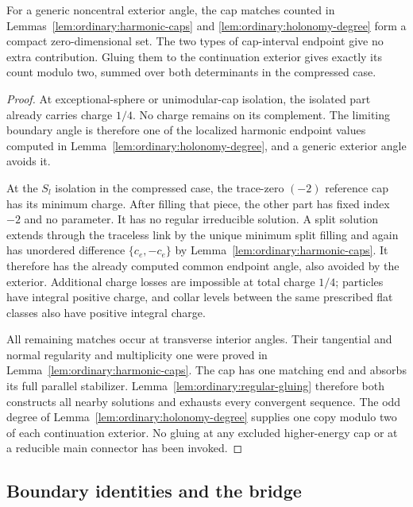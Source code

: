 \begin{lemma}
\label{lem:ordinary:cap-end-compactness}
For a generic noncentral exterior angle, the cap matches counted
in Lemmas~\ref{lem:ordinary:harmonic-caps} and
\ref{lem:ordinary:holonomy-degree} form a compact zero-dimensional
set.  The two types of cap-interval endpoint give no extra
contribution.  Gluing them to the continuation exterior gives
exactly its count modulo two, summed over both determinants
in the compressed case.
\end{lemma}
\begin{proof}
At exceptional-sphere or unimodular-cap isolation, the isolated
part already carries charge $1/4$.  No charge remains on
its complement.  The limiting boundary angle is therefore
one of the localized harmonic endpoint values computed in
Lemma~\ref{lem:ordinary:holonomy-degree}, and a generic
exterior angle avoids it.

At the $S_l$ isolation in the compressed case, the
trace-zero $(-2)$ reference cap has its minimum charge.
After filling that piece, the other part has fixed
index $-2$ and no parameter.  It has no regular
irreducible solution.  A split solution extends
through the traceless link by the unique minimum
split filling and again has unordered difference
$\{c_e,-c_e\}$ by
Lemma~\ref{lem:ordinary:harmonic-caps}.  It therefore
has the already computed common endpoint angle,
also avoided by the exterior.  Additional charge
losses are impossible at total charge $1/4$;
particles have integral positive charge, and collar
levels between the same prescribed flat classes
also have positive integral charge.

All remaining matches occur at transverse interior
angles.  Their tangential and normal regularity and
multiplicity one were proved in
Lemma~\ref{lem:ordinary:harmonic-caps}.  The cap has
one matching end and absorbs its full parallel
stabilizer.  Lemma~\ref{lem:ordinary:regular-gluing}
therefore both constructs all nearby solutions and
exhausts every convergent sequence.  The odd degree
of Lemma~\ref{lem:ordinary:holonomy-degree} supplies
one copy modulo two of each continuation exterior.
No gluing at any excluded higher-energy cap or at
a reducible main connector has been invoked.
\end{proof}

\subsection{Boundary identities and the bridge}

